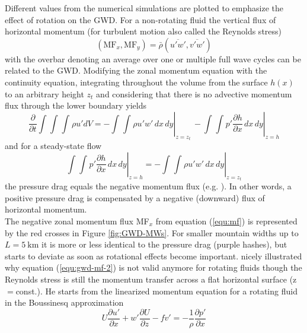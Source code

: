 Different values from the numerical simulations are plotted to emphasize the effect of rotation on the GWD. For a non-rotating fluid the vertical flux of horizontal momentum (for turbulent motion also called the Reynolds stress)
\begin{equation}
    (\mathrm{MF}_x, \mathrm{MF}_y) = \bar{\rho}  (\overbar{u'w'},\overbar{v'w'})
    \label{equ:mf}
\end{equation}
with the overbar denoting an average over one or multiple full wave cycles can be related to the GWD. Modifying the zonal momentum equation with the continuity equation, integrating throughout the volume from the surface $h(x)$ to an arbitrary height $z_t$ and considering that there is no advective momentum flux through the lower boundary yields
\begin{equation}
    \frac{\partial}{\partial t}\int_{}^{} \int_{}^{} \int_{}^{} \rho u' dV = - \left.\int_{}^{} \int_{}^{} \rho u'w' \, dx \, dy \right\vert_{z=z_t}  \,
    - \left.\int_{}^{} \int_{}^{} p' \frac{\partial h}{\partial x} \, dx \, dy \right\vert_{z=h}
    \label{equ:gwd-mf}
\end{equation}
and for a steady-state flow
\begin{equation}
    \left.\int_{}^{} \int_{}^{} p' \frac{\partial h}{\partial x} \, dx \, dy \right\vert_{z=h} =  -\left.\int_{}^{}  \int_{}^{} \rho u'w' \, dx \, dy \right\vert_{z=z_t}
    \label{equ:gwd-mf-2}
\end{equation}
the pressure drag equals the negative momentum flux (e.g. \cite[]{durran_lee_2003}). In other words, a positive pressure drag is compensated by a negative (downward) flux of horizontal momentum. \\
The negative zonal momentum flux MF$_x$ from equation (\ref{equ:mf}) is represented by the red crosses in Figure \ref{fig:GWD-MWs}. For smaller mountain widths up to $L=\SI{5}{\kilo\meter}$ it is more or less identical to the pressure drag (purple hashes), but starts to deviate as soon as rotational effects become important. \textcite[]{bretherton_momentum_1969} nicely illustrated why equation (\ref{equ:gwd-mf-2}) is not valid anymore for rotating fluids though the Reynolds stress is still the momentum transfer across a flat horizontal surface (z$=$const.). He starts from the linearized momentum equation for a rotating fluid in the Boussinesq approximation
\begin{equation}
    U \frac{\partial u'}{\partial x} + w' \frac{\partial U}{\partial z} - f v' = -\frac{1}{\rho} \frac{\partial p'}{\partial x}
    \label{equ:momEqu-rotating}
\end{equation}

